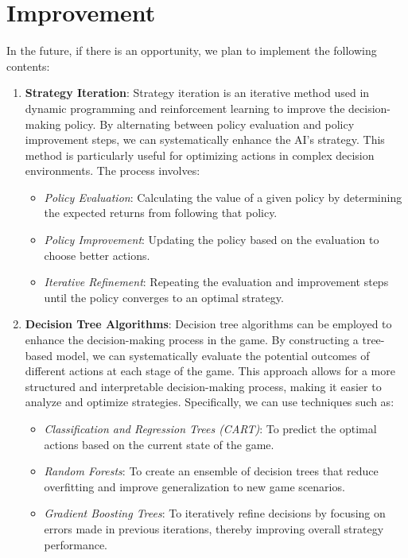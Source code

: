 \documentclass{article}
\begin{document}
\section{Improvement}
In the future, if there is an opportunity, we plan to implement the following contents:
\begin{enumerate}
    \item \textbf{Strategy Iteration}:
    Strategy iteration is an iterative method used in dynamic programming and reinforcement learning to improve the decision-making policy. By alternating between policy evaluation and policy improvement steps, we can systematically enhance the AI's strategy. This method is particularly useful for optimizing actions in complex decision environments. The process involves:
    \begin{itemize}
        \item \textit{Policy Evaluation}: Calculating the value of a given policy by determining the expected returns from following that policy.
        \item \textit{Policy Improvement}: Updating the policy based on the evaluation to choose better actions.
        \item \textit{Iterative Refinement}: Repeating the evaluation and improvement steps until the policy converges to an optimal strategy.
    \end{itemize}

    \item \textbf{Decision Tree Algorithms}:
    Decision tree algorithms can be employed to enhance the decision-making process in the game. By constructing a tree-based model, we can systematically evaluate the potential outcomes of different actions at each stage of the game. This approach allows for a more structured and interpretable decision-making process, making it easier to analyze and optimize strategies. Specifically, we can use techniques such as:
    \begin{itemize}
        \item \textit{Classification and Regression Trees (CART)}: To predict the optimal actions based on the current state of the game.
        \item \textit{Random Forests}: To create an ensemble of decision trees that reduce overfitting and improve generalization to new game scenarios.
        \item \textit{Gradient Boosting Trees}: To iteratively refine decisions by focusing on errors made in previous iterations, thereby improving overall strategy performance.
    \end{itemize}


\end{enumerate}
\end{document}
